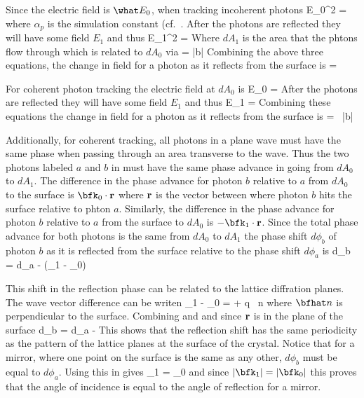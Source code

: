 Since the electric field is $\what E_0$, when tracking incoherent photons
\Begineq
  \what E_0^2 = 
\Endeq
where $\alpha_p$ is the simulation constant (cf.~. 
After the photons are reflected they will have some field $E_1$ and thus
\Begineq
  \what E_1^2 = 
\Endeq
Where $dA_1$ is the area that the phtons flow through which is related
to $dA_0$ via
\Begineq
   = \frac{\bfk_1 \cdot \bfz}{\bfk_0 \cdot \bfz} \equiv |b|
\Endeq
Combining the above three equations, the change in field for a photon
as it reflects from the surface is
\Begineq
   =  \,  
  \qquad {}
\Endeq

For coherent photon tracking the electric field at $dA_0$ is
\Begineq
  \what E_0 = 
\Endeq
After the photons are reflected they will have some field $E_1$ and thus
\Begineq
  \what E_1 = 
\Endeq
Combining these equations the change in field for a photon
as it reflects from the surface is
\Begineq
   =  \, |b| 
  \qquad {}
\Endeq

Additionally, for coherent tracking, all photons in a plane wave must
have the same phase when passing through an area transverse to the
wave. Thus the two photons labeled $a$ and $b$ in
 must have the same phase advance in going from
$dA_0$ to $dA_1$. The difference in the phase advance for photon $b$
relative to $a$ from $dA_0$ to the surface is $\bfk_0 \cdot \bfr$
where ${\bf r}$ is the vector between where photon $b$ hits the surface
relative to phton $a$. Similarly, the difference in the phase advance
for photon $b$ relative to $a$ from the surface to $dA_0$ is $-\bfk_1
\cdot \bfr$. Since the total phase advance for both photons is the
same from $dA_0$ to $dA_1$ the phase shift $d\phi_b$ of photon $b$ as
it is reflected from the surface relative to the phase shift $d\phi_a$
is
\Begineq
  d\phi_b = d\phi_a - (\bfk_1 - \bfk_0) \cdot \bfr
  \label{dpbdpa}
\Endeq

This shift in the reflection phase can be related to the lattice
diffration planes. The wave vector difference can be writen
\Begineq
  \bfk_1 - \bfk_0 = \bfH + q \, \bfhat n
  \label{k1k0}
\Endeq
where $\bfhat n$ is perpendicular to the surface. Combining
 and  and since ${\bf r}$ is in
the plane of the surface
\Begineq
  d\phi_b = d\phi_a - \bfH \cdot \bfr
\Endeq
This shows that the reflection shift has the same periodicity as the
pattern of the lattice planes at the surface of the crystal. Notice
that for a mirror, where one point on the surface is the same as any
other, $d\phi_b$ must be equal to $d\phi_a$. Using this in 
gives 
\Begineq
  \bfk_1 \cdot \bfr = \bfk_0 \cdot \bfr
\Endeq
and since $|\bfk_1| = |\bfk_0|$ this proves that the angle of
incidence is equal to the angle of reflection for a mirror.

